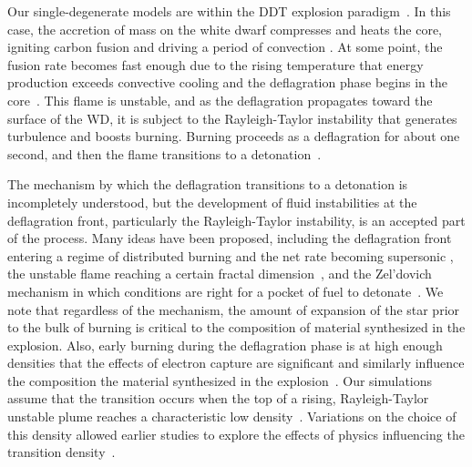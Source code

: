 \documentclass[iop,apj]{emulateapj}
\begin{document}
Our single-degenerate models are within the DDT explosion paradigm~\citep{1986SvAL,
Khokhlov1991Delayed-detonat,NiemWoos97,Niem99,belletal2004,fishjump2015}.
In this case, the accretion of mass on the white dwarf compresses and
heats the core, igniting carbon fusion and driving a period of convection
\citep{WoosWunsKuhl04,wunschwoosley2004,Kuhletal06,nonakaetal2012}.
At some point, the fusion rate becomes fast enough due to the rising
temperature that energy production exceeds convective cooling and
the deflagration phase begins in the core~\citep{Nomo84,WoosWunsKuhl04}.
This flame is unstable, and as the deflagration propagates toward the surface
of the WD, it is subject to the Rayleigh-Taylor instability that generates
turbulence and boosts burning.
Burning proceeds as a deflagration for about one second, and then
the flame transitions to a detonation~\citep{hoflich.khokhlov.ea:delayed}.



The mechanism by which the deflagration transitions to a detonation
is incompletely understood, but the development of fluid instabilities
at the deflagration front, particularly the Rayleigh-Taylor
instability, is an accepted part of the process.
Many ideas have been proposed, including the deflagration front
entering a regime of distributed burning and the net
rate becoming supersonic \citep{NiemWoos97}, the unstable
flame reaching a certain fractal dimension~\citep{woosley90},
and the Zel'dovich mechanism in which conditions are right for
a pocket of fuel to
detonate~\citep{zeldovichetal1970,KhokOranWhee97,jacketal2014}.
We note that regardless of
the mechanism, the amount of expansion of the star prior to the bulk of burning
is critical to the composition of material synthesized in the explosion. Also,
early burning during the deflagration phase is at high enough densities that
the effects of electron capture are significant and similarly influence the
composition the material synthesized in the explosion~\citep{hoeflichetal2004,
hoeflich2006,fesenetal2007,diamondetal2018}.
Our simulations assume that the transition occurs when the top of a
rising, Rayleigh-Taylor unstable plume reaches a characteristic low
density~\citep{townsley.calder.ea:flame}.
Variations on the choice of this density allowed earlier studies to explore
the effects of physics influencing the transition
density~\citep{jacketal2010,Krueger2010On-Variations-o,Kruegeretal2012}.
\end{document}
